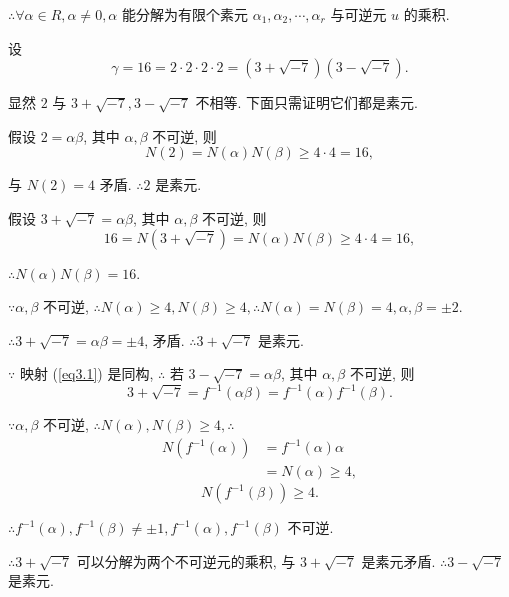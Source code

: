 \documentclass[color=black,device=normal,lang=cn,mode=geye]{elegantnote}
\begin{document}
\begin{example}
    $\therefore\forall\alpha\in R,\alpha\neq0,\alpha$ 能分解为有限个素元 $\alpha_1,\alpha_2,\cdots,\alpha_r$ 与可逆元 $u$ 的乘积.

    设
    \[\gamma=16=2\cdot2\cdot2\cdot2=(3+\sqrt{-7})(3-\sqrt{-7}).\]

    显然 $2$ 与 $3+\sqrt{-7},3-\sqrt{-7}$ 不相等. 下面只需证明它们都是素元.

    假设 $2=\alpha\beta$, 其中 $\alpha,\beta$ 不可逆, 则
    \[N(2)=N(\alpha)N(\beta)\geq4\cdot4=16,\]

    与 $N(2)=4$ 矛盾. $\therefore 2$ 是素元.
    
    假设 $3+\sqrt{-7}=\alpha\beta$, 其中 $\alpha,\beta$ 不可逆, 则
    \[16=N(3+\sqrt{-7})=N(\alpha)N(\beta)\geq4\cdot4=16,\]

    $\therefore N(\alpha)N(\beta)=16$.

    $\because\alpha,\beta$ 不可逆, $\therefore N(\alpha)\geq4,N(\beta)\geq4,\therefore N(\alpha)=N(\beta)=4,\alpha,\beta=\pm2$.

    $\therefore3+\sqrt{-7}=\alpha\beta=\pm4$, 矛盾. $\therefore3+\sqrt{-7}$ 是素元.

    $\because$ 映射 (\ref{eq3.1}) 是同构, $\therefore$ 若 $3-\sqrt{-7}=\alpha\beta$, 其中 $\alpha,\beta$ 不可逆, 则
    \[3+\sqrt{-7}=f^{-1}(\alpha\beta)=f^{-1}(\alpha)f^{-1}(\beta).\]

    $\because\alpha,\beta$ 不可逆, $\therefore N(\alpha),N(\beta)\geq4,\therefore$
    \begin{align*}
        N(f^{-1}(\alpha)) & =f^{-1}(\alpha)\alpha \\
        & =N(\alpha)\geq4,
    \end{align*}
    \[N(f^{-1}(\beta))\geq4.\]

    $\therefore f^{-1}(\alpha),f^{-1}(\beta)\neq\pm1,f^{-1}(\alpha),f^{-1}(\beta)$ 不可逆.

    $\therefore3+\sqrt{-7}$ 可以分解为两个不可逆元的乘积, 与 $3+\sqrt{-7}$ 是素元矛盾. $\therefore3-\sqrt{-7}$ 是素元.
\end{example}
\end{document}
